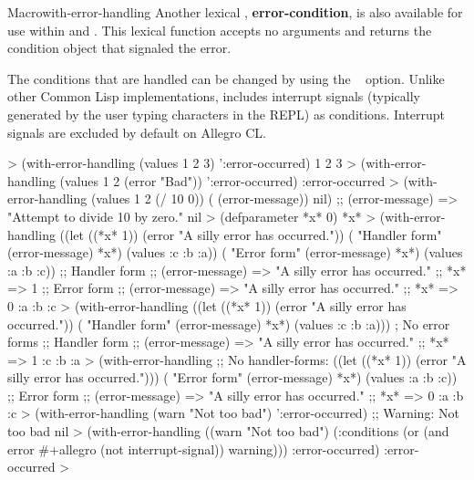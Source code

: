 \documentclass[10pt,twoside,english,pdftex]{article}
\begin{document}
\begin{functiondoc}{Macro}{with-error-handling}
Another lexical , \textbf{error-condition}, is also available for use
within  and .  This lexical function
accepts no arguments and returns the condition object that signaled the error.

The conditions that are handled can be changed by using the
\mbox{ \code{)}} option. Unlike other Common
Lisp implementations,  includes
interrupt signals (typically generated by the user typing  characters
in the REPL) as  conditions.  Interrupt signals are excluded by
default on Allegro CL.

%
\fnexamples
%
\W\supp
\begin{example}
  > (with-error-handling (values 1 2 3) ':error-occurred)
  1
  2
  3
  > (with-error-handling (values 1 2 (error "Bad")) ':error-occurred)
  :error-occurred
  > (with-error-handling (values 1 2 (/ 10 0)) ( (error-message)) nil)
  ;;  (error-message) => "Attempt to divide 10 by zero."
  nil\goodpagebreak
  > (defparameter *x* 0)
  *x*
  > (with-error-handling 
        ((let ((*x* 1))
           (error "A silly error has occurred."))
         ( "Handler form" (error-message) *x*)
         (values :c :b :a))
      ( "Error form" (error-message) *x*)
      (values :a :b :c))
  ;; Handler form
  ;;  (error-message) => "A silly error has occurred."
  ;;  *x* => 1
  ;; Error form
  ;;  (error-message) => "A silly error has occurred."
  ;;  *x* => 0
  :a
  :b
  :c\goodpagebreak
  > (with-error-handling 
        ((let ((*x* 1))
           (error "A silly error has occurred."))
         ( "Handler form" (error-message) *x*)
         (values :c :b :a)))          ; No error forms
  ;; Handler form
  ;;  (error-message) => "A silly error has occurred."
  ;;  *x* => 1
  :c
  :b
  :a\goodpagebreak
  > (with-error-handling 
        ;; No handler-forms:
        ((let ((*x* 1))
           (error "A silly error has occurred.")))
      ( "Error form" (error-message) *x*)
      (values :a :b :c))
  ;; Error form
  ;;  (error-message) => "A silly error has occurred."
  ;;  *x* => 0
  :a
  :b
  :c\goodpagebreak
  > (with-error-handling (warn "Not too bad") ':error-occurred)
  ;; Warning: Not too bad
  nil
  > (with-error-handling ((warn "Not too bad")
                          (:conditions (or (and error
                                                #+allegro
                                                (not interrupt-signal))
                                           warning))) 
      :error-occurred)
  :error-occurred
  >
\end{example}

\end{functiondoc}
\end{document}
